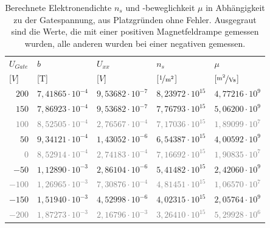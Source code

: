 \begin{table}[h]
	\centering
	\begin{tabular}{|r|r|l|r|r|}
		\hline
		\multicolumn{1}{|l|}{\cellcolor{black!30} $U_{Gate}$ } & \multicolumn{1}{|l|}{\cellcolor{black!30} $b$ } & \multicolumn{1}{|l|}{\cellcolor{black!30} $U_{xx}$ } & \multicolumn{1}{|l|}{\cellcolor{black!30} $n_s$ } & \multicolumn{1}{|l|}{\cellcolor{black!30} $\mu$ } \\
		\multicolumn{1}{|l|}{\cellcolor{black!30} [$\unit{V}$] } &  \multicolumn{1}{|l|}{\cellcolor{black!30} [\unit{T}] } &
		\multicolumn{1}{|l|}{\cellcolor{black!30} [$\unit{V}$] } &  \multicolumn{1}{|l|}{\cellcolor{black!30} [$\unitfrac{1}{m^2}$] } & \multicolumn{1}{|l|}{\cellcolor{black!30} [$\unitfrac{m^2}{Vs}$] } \\ \hline
		$ 200 $  & $ 7,41865\cdot 10^{-4} $  & $ 9,53682\cdot 10^{-7} $  & $ 8,23972\cdot 10^{15} $  & $ 4,77216\cdot 10^{9} $  \\ 
		$ 150 $  & $ 7,86923\cdot 10^{-4} $  & $ 9,53682\cdot 10^{-7} $  & $ 7,76793\cdot 10^{15} $  & $ 5,06200\cdot 10^{9} $  \\ 
		\textcolor{gray}{$ 100 $}  & \textcolor{gray}{$ 8,52505\cdot 10^{-4} $}  & \textcolor{gray}{$ 2,76567\cdot 10^{-4} $}  & \textcolor{gray}{$ 7,17036\cdot 10^{15} $}  & \textcolor{gray}{$ 1,89099\cdot 10^{7} $}  \\ 
		$ 50 $  & $ 9,34121\cdot 10^{-4} $  & $ 1,43052\cdot 10^{-6} $  & $ 6,54387\cdot 10^{15} $  & $ 4,00592\cdot 10^{9} $  \\ 
		\textcolor{gray}{$ 0 $}  & \textcolor{gray}{$ 8,52914\cdot 10^{-4} $}  & \textcolor{gray}{$ 2,74183\cdot 10^{-4} $}  & \textcolor{gray}{$ 7,16692\cdot 10^{15} $}  & \textcolor{gray}{$ 1,90835\cdot 10^{7} $}  \\ 
		$ -50 $  & $ 1,12890\cdot 10^{-3} $  & $ 2,86104\cdot 10^{-6} $  & $ 5,41482\cdot 10^{15} $  & $ 2,42060\cdot 10^{9} $  \\ 
		\textcolor{gray}{$ -100 $}  & \textcolor{gray}{$ 1,26965\cdot 10^{-3} $}  & \textcolor{gray}{$ 7,30876\cdot 10^{-4} $}  & \textcolor{gray}{$ 4,81451\cdot 10^{15} $}  & \textcolor{gray}{$ 1,06570\cdot 10^{7} $}  \\ 
		$ -150 $  & $ 1,51940\cdot 10^{-3} $  & $ 4,52998\cdot 10^{-6} $  & $ 4,02315\cdot 10^{15} $  & $ 2,05764\cdot 10^{9} $  \\ 
		\textcolor{gray}{$ -200 $}  & \textcolor{gray}{$ 1,87273\cdot 10^{-3} $}  & \textcolor{gray}{$ 2,16796\cdot 10^{-3} $}  & \textcolor{gray}{$ 3,26410\cdot 10^{15} $}  & \textcolor{gray}{$ 5,29928\cdot 10^{6} $}  \\ \hline
	\end{tabular}
	\caption{Berechnete Elektronendichte $n_s$ und -beweglichkeit $\mu$ in Abhängigkeit zu der Gatespannung, aus Platzgründen ohne Fehler. Ausgegraut sind die Werte, die mit einer positiven Magnetfeldrampe gemessen wurden, alle anderen wurden bei einer negativen gemessen.}
	\label{tab:gate_ausw}
\end{table}


